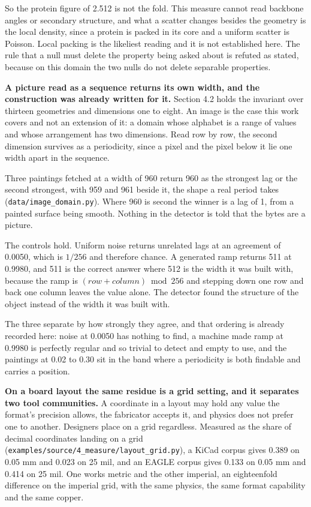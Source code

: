 So the protein figure of 2.512 is not the fold. This measure cannot read backbone angles or secondary structure, and what a scatter changes besides the geometry is the local density, since a protein is packed in its core and a uniform scatter is Poisson. Local packing is the likeliest reading and it is not established here. The rule that a null must delete the property being asked about is refuted as stated, because on this domain the two nulls do not delete separable properties.

\textbf{A picture read as a sequence returns its own width, and the construction was already written for it.} Section 4.2 holds the invariant over thirteen geometries and dimensions one to eight. An image is the case this work covers and not an extension of it: a domain whose alphabet is a range of values and whose arrangement has two dimensions. Read row by row, the second dimension survives as a periodicity, since a pixel and the pixel below it lie one width apart in the sequence.

Three paintings fetched at a width of 960 return 960 as the strongest lag or the second strongest, with 959 and 961 beside it, the shape a real period takes (\texttt{data/\allowbreak{}image\_\allowbreak{}domain.\allowbreak{}py}). Where 960 is second the winner is a lag of 1, from a painted surface being smooth. Nothing in the detector is told that the bytes are a picture.

The controls hold. Uniform noise returns unrelated lags at an agreement of 0.0050, which is \(1/256\) and therefore chance. A generated ramp returns 511 at 0.9980, and 511 is the correct answer where 512 is the width it was built with, because the ramp is \((row + column) \bmod 256\) and stepping down one row and back one column leaves the value alone. The detector found the structure of the object instead of the width it was built with.

The three separate by how strongly they agree, and that ordering is already recorded here: noise at 0.0050 has nothing to find, a machine made ramp at 0.9980 is perfectly regular and so trivial to detect and empty to use, and the paintings at 0.02 to 0.30 sit in the band where a periodicity is both findable and carries a position.

\textbf{On a board layout the same residue is a grid setting, and it separates two tool communities.} A coordinate in a layout may hold any value the format's precision allows, the fabricator accepts it, and physics does not prefer one to another. Designers place on a grid regardless. Measured as the share of decimal coordinates landing on a grid (\texttt{examples/\allowbreak{}source/\allowbreak{}4\_\allowbreak{}measure/\allowbreak{}layout\_\allowbreak{}grid.\allowbreak{}py}), a KiCad corpus gives 0.389 on 0.05 mm and 0.023 on 25 mil, and an EAGLE corpus gives 0.133 on 0.05 mm and 0.414 on 25 mil. One works metric and the other imperial, an eighteenfold difference on the imperial grid, with the same physics, the same format capability and the same copper.


